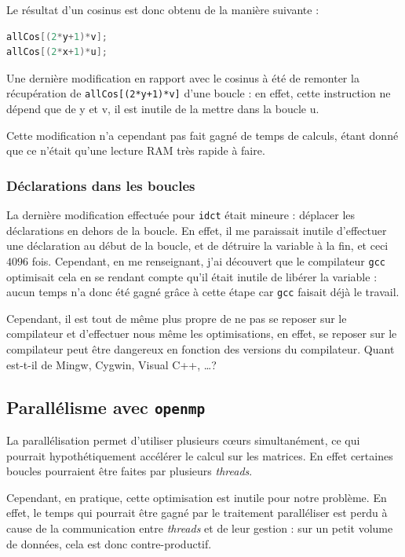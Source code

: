 \documentclass[a4paper, 11pt]{article}
\begin{document}
	Le résultat d'un cosinus est donc obtenu de la manière suivante :
	\begin{lstlisting}[language=C,numbers=none, caption=Obtention du résultat d'un cosinus]
allCos[(2*y+1)*v];
allCos[(2*x+1)*u];
\end{lstlisting}

Une dernière modification en rapport avec le cosinus à été de remonter la récupération de \texttt{allCos[(2*y+1)*v]} d'une boucle : 
en effet, cette instruction ne dépend que de y et v, il est inutile de la mettre dans la boucle u.
\begin{remarque}
	Cette modification n'a cependant pas fait gagné de temps de calculs, étant donné que ce n'était qu'une lecture RAM très rapide à faire.	
\end{remarque}
	\subsubsection{Déclarations dans les boucles}
	La dernière modification effectuée pour \texttt{idct} était mineure : déplacer les déclarations en dehors de la boucle. En effet, il me paraissait inutile
	d'effectuer une déclaration au début de la boucle, et de détruire la variable à la fin, et ceci $4096$ fois. Cependant, en me renseignant, j'ai découvert que
	le compilateur \texttt{gcc} optimisait cela en se rendant compte qu'il était inutile de libérer la variable : aucun temps n'a donc été gagné grâce à cette
	étape car \texttt{gcc} faisait déjà le travail. 

	Cependant, il est tout de même plus propre de ne pas se reposer sur le compilateur et d'effectuer nous même les optimisations, en effet, se reposer sur le
	compilateur peut être dangereux en fonction des versions du compilateur. Quant est-t-il de Mingw, Cygwin, Visual C++, \ldots ?
	\subsection{Parallélisme avec \texttt{openmp}}
	La parallélisation permet d'utiliser plusieurs cœurs simultanément, ce qui pourrait hypothétiquement accélérer le calcul sur les matrices. En effet certaines
	boucles pourraient être faites par plusieurs \textit{threads}.

	Cependant, en pratique, cette optimisation est inutile pour notre problème. En effet, le temps qui pourrait être gagné par le traitement paralléliser est
	perdu à cause de la communication entre \textit{threads} et de leur gestion : sur un petit volume de données, cela est donc contre-productif.
\end{document}
